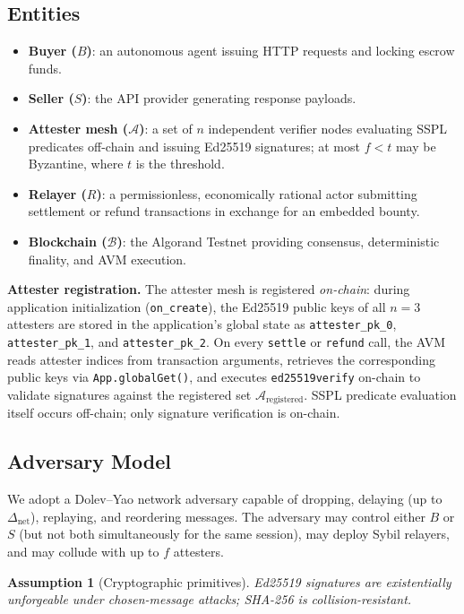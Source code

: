 \documentclass[journal]{IEEEtran}
\newtheorem{assumption}{Assumption}
\newcommand{\set}[1]{\mathcal{#1}}
\begin{document}
\subsection{Entities}
\begin{itemize}[leftmargin=*]
\item \textbf{Buyer ($B$)}: an autonomous agent issuing HTTP requests
and locking escrow funds.
\item \textbf{Seller ($S$)}: the API provider generating response
payloads.
\item \textbf{Attester mesh ($\set{A}$)}: a set of $n$ independent
verifier nodes evaluating SSPL predicates off-chain and issuing
Ed25519 signatures; at most $f < t$ may be Byzantine, where $t$ is
the threshold.
\item \textbf{Relayer ($R$)}: a permissionless, economically rational
actor submitting settlement or refund transactions in exchange for an
embedded bounty.
\item \textbf{Blockchain ($\set{B}$)}: the Algorand Testnet providing
consensus, deterministic finality, and AVM execution.
\end{itemize}

\noindent\textbf{Attester registration.}
The attester mesh is registered \emph{on-chain}: during application
initialization (\texttt{on\_create}), the Ed25519 public keys of all
$n = 3$ attesters are stored in the application's global state as
\texttt{attester\_pk\_0}, \texttt{attester\_pk\_1}, and
\texttt{attester\_pk\_2}.
On every \texttt{settle} or \texttt{refund} call, the AVM reads
attester indices from transaction arguments, retrieves the
corresponding public keys via \texttt{App.globalGet()}, and executes
\texttt{ed25519verify} on-chain to validate signatures against the
registered set $\set{A}_{\text{registered}}$.
SSPL predicate evaluation itself occurs off-chain; only signature
verification is on-chain.

\subsection{Adversary Model}
We adopt a Dolev--Yao network adversary capable of dropping, delaying
(up to $\Delta_{\text{net}}$), replaying, and reordering messages.
The adversary may control either $B$ or $S$ (but not both
simultaneously for the same session), may deploy Sybil relayers, and
may collude with up to $f$ attesters.

\begin{assumption}[Cryptographic primitives]
\label{asm:crypto}
Ed25519 signatures are existentially unforgeable under chosen-message
attacks; SHA-256 is collision-resistant.
\end{assumption}
\end{document}
